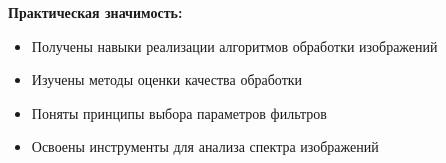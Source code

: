 \textbf{Практическая значимость:}
\begin{itemize}
    \item Получены навыки реализации алгоритмов обработки изображений
    \item Изучены методы оценки качества обработки
    \item Поняты принципы выбора параметров фильтров
    \item Освоены инструменты для анализа спектра изображений
\end{itemize}
